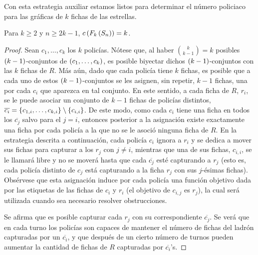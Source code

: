 Con esta estrategia auxiliar estamos listos para determinar el n\'umero
policiaco para las gr\'aficas de $k$ fichas de las estrellas.


\begin{teorema}
\label{teo:numero-de-policia-estrella}
    Para $k\geq 2$ y $n\geq 2k-1$, $c\left( F_{k}\left( S_{n}\right)\right)=k$.
\end{teorema}

\begin{proof}
    Sean $c_1,\dots, c_k$ los $k$ polic\'ias. N\'otese que, al haber
    $\binom{k}{k-1}=k$ posibles $\left( k-1\right)$-conjuntos de $\left( c_1,\dots,
    c_k\right)$, es posible biyectar dichos $\left( k-1\right)$-conjuntos con las $k$ fichas
    de $R$. M\'as a\'un, dado que cada polic\'ia tiene $k$ fichas, es posible
    que a cada uno de estos $\left( k-1\right)$-conjuntos se les asignen, sin repetir,
    $k-1$ fichas, una por cada $c_i$ que aparezca en tal conjunto. En este
    sentido, a cada ficha de $R$, $r_i$, se le puede asociar un conjunto de
    $k-1$ fichas de polic\'ias distintos,
    $\overline{c_i}=\left\{ c_{1,i},\dots,c_{k,i}\right\}\setminus\left\{ c_{i,i}\right\}$. De este
    modo, como cada $c_i$ tiene una ficha en todos los $\overline{c_j}$ salvo
    para el $j=i$, entonces posterior a la asignaci\'on existe exactamente una
    ficha por cada polic\'ia a la que no se le asoci\'o ninguna ficha de $R$. En
    la estrategia descrita a continuaci\'on, cada polic\'ia $c_i$ ignora a $r_i$
    y se dedica a mover sus fichas para capturar a los $r_j$ con $j\neq i$,
    mientras que una de sus fichas, $c_{i,i}$, se le llamar\'a libre y no se
    mover\'a hasta que cada $\overline{c_j}$ est\'e capturando a $r_j$ (esto es,
    cada polic\'ia distinto de $c_j$ est\'a capturando a la ficha $r_j$ con sus
    $j$-\'esimas fichas). Obs\'ervese que esta asignaci\'on induce por cada
    polic\'ia una funci\'on objetivo dada por las etiquetas de las fichas de
    $c_i$ y $r_i$ (el objetivo de $c_{i,j}$ es $r_j$), la cual ser\'a utilizada
    cuando sea necesario resolver obstrucciones.

    Se afirma que es posible capturar cada $r_j$ con su correspondiente
    $\overline{c_j}$. Se ver\'a que en cada turno los polic\'ias son capaces de
    mantener el n\'umero de fichas del ladr\'on capturadas por un
    $\overline{c_i}$, y que despu\'es de un cierto n\'umero de turnos pueden
    aumentar la cantidad de fichas de $R$ capturadas por $\overline{c_i}$'s.


\end{proof}
